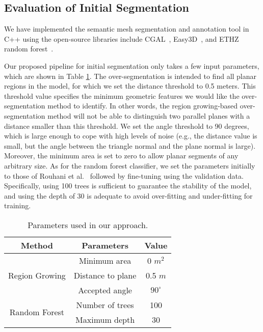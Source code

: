 \subsection{Evaluation of Initial Segmentation}
We have implemented the semantic mesh segmentation and annotation tool in C++ using the open-source libraries include CGAL~\citep{cgal:eb-20b}, Easy3D~\citep{easy3d2018nan}, and ETHZ random forest~\citep{ethzrf}. 

Our proposed pipeline for initial segmentation only takes a few input parameters, which are shown in Table \ref{tab:params}.
The over-segmentation is intended to find all planar regions in the model, for which we set the distance threshold to 0.5 meters. This threshold value specifies the minimum geometric features we would like the over-segmentation method to identify. 
In other words, the region growing-based over-segmentation method will not be able to distinguish two parallel planes with a distance smaller than this threshold.
We set the angle threshold to 90 degrees, which is large enough to cope with high levels of noise (e.g., the distance value is small, but the angle between the triangle normal and the plane normal is large).
Moreover, the minimum area is set to zero to allow planar segments of any arbitrary size.
As for the random forest classifier, \textcolor{ao}{we set the parameters initially to those of Rouhani et al.~\citep{Rouhani2017} followed by fine-tuning using the validation data.}
Specifically, using 100 trees is sufficient to guarantee the stability of the model, and using the depth of 30 is adequate to avoid over-fitting and under-fitting for training.
\begin{table}[H]
	\centering
	\noindent{}
	{
		\begin{threeparttable}
				\centering
				\begin{tabular}{ccc}
					\toprule
					Method & Parameters & Value \\
					\midrule
					\multirow{3}[2]{*}{Region Growing} & Minimum area & 0 $m^2$ \\
					& Distance to plane & 0.5 \textcolor{ao}{$m$} \\
					& Accepted angle & $90^{\circ}$ \\
					\midrule
					\multirow{2}[2]{*}{Random Forest} & Number of trees & 100 \\
					& Maximum depth & 30 \\
					\bottomrule
				\end{tabular}%
		\end{threeparttable}
	}
	\caption{Parameters used in our approach.} 
	\label{tab:params}
\end{table}%

